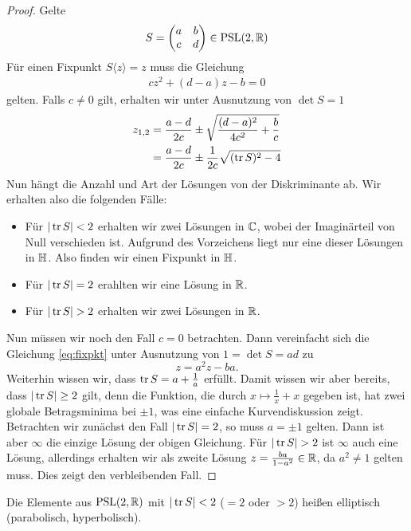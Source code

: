 \begin{proof}
  Gelte
  \[
  S =
  \begin{pmatrix}
    a & b\\
    c & d
  \end{pmatrix} \in \operatorname{PSL}(2, \mathbb{R})
  \]
  Für einen Fixpunkt $S \langle z \rangle = z$ muss die Gleichung
  \begin{align}
    \label{eq:fixpkt}
    c z^2 + (d-a)z - b = 0
  \end{align}
  gelten. Falls $c \neq 0$ gilt, erhalten wir unter Ausnutzung von $\det S = 1$
  \begin{align*}
    z_{1,2} & = \frac{a-d}{2c} \pm \sqrt{\frac{(d-a)^2}{4c^2} +
      \frac{b}{c}} \\
    & = \frac{a-d}{2c} \pm \frac{1}{2c} \sqrt{(\operatorname{tr} S)^2 - 4}
  \end{align*}
  Nun hängt die Anzahl und Art der Lösungen von der Diskriminante
  ab. Wir erhalten also die folgenden Fälle:
  \begin{itemize}
  \item Für $|\operatorname{tr} S| < 2$ erhalten wir zwei Lösungen in $\mathbb{C}$, wobei
    der Imaginärteil von Null verschieden ist. Aufgrund des
    Vorzeichens liegt nur eine dieser Lösungen in $\mathbb{H}$. Also finden
    wir einen Fixpunkt in $\mathbb{H}$.
  \item Für $|\operatorname{tr} S| = 2$ erahlten wir eine Lösung in $\mathbb{R}$.
  \item Für $|\operatorname{tr} S| > 2$ erhalten wir zwei Lösungen in $\mathbb{R}$.
  \end{itemize}
  Nun müssen wir noch den Fall $c = 0$ betrachten. Dann vereinfacht
  sich die Gleichung \eqref{eq:fixpkt} unter Ausnutzung von $1 = \det
  S = ad$ zu
  \[
  z = a^2 z - ba.
  \]
  Weiterhin wissen wir, dass $\operatorname{tr} S = a + \frac{1}{a}$ erfüllt. Damit
  wissen wir aber bereits, dass $|\operatorname{tr} S| \geq 2$ gilt, denn die
  Funktion, die durch $x \mapsto \frac{1}{x} + x$ gegeben ist, hat
  zwei globale Betragsminima bei $\pm 1$, was eine einfache
  Kurvendiskussion zeigt. Betrachten wir zunächst den Fall $|\operatorname{tr} S| =
  2$, so muss $a = \pm 1$ gelten. Dann ist aber $\infty$ die einzige
  Lösung der obigen Gleichung. Für $|\operatorname{tr} S| > 2$ ist $\infty$ auch
  eine Lösung, allerdings erhalten wir als zweite Lösung $z =
  \frac{ba}{1-a^2} \in \mathbb{R}$, da $a^2 \neq 1$ gelten muss. Dies zeigt
  den verbleibenden Fall.
\end{proof}

\begin{defin}
  Die Elemente aus $\operatorname{PSL}(2,\mathbb{R})$ mit $|\operatorname{tr} S| < 2$ ($ = 2$ oder $ > 2$)
  heißen elliptisch (parabolisch, hyperbolisch).
\end{defin}

